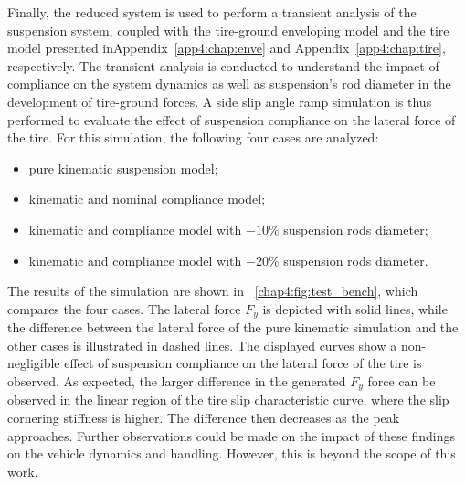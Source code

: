 Finally, the reduced system is used to perform a transient analysis of the suspension system, coupled with the tire-ground enveloping model and the tire model presented inAppendix~\ref{app4:chap:enve} and Appendix~\ref{app4:chap:tire}, respectively. The transient analysis is conducted to understand the impact of compliance on the system dynamics as well as suspension's rod diameter in the development of tire-ground forces. A side slip angle ramp simulation is thus performed to evaluate the effect of suspension compliance on the lateral force of the tire. For this simulation, the following four cases are analyzed:
%
\begin{itemize}
  \setlength\itemsep{0.0em}
  \item pure kinematic suspension model;
  \item kinematic and nominal compliance model;
  \item kinematic and compliance model with $-10\%$ suspension rods diameter;
  \item kinematic and compliance model with $-20\%$ suspension rods diameter.
\end{itemize}
%
The results of the simulation are shown in \figurename~\ref{chap4:fig:test_bench}, which compares the four cases. The lateral force $F_y$ is depicted with solid lines, while the difference between the lateral force of the pure kinematic simulation and the other cases is illustrated in dashed lines. The displayed curves show a non-negligible effect of suspension compliance on the lateral force of the tire is observed. As expected, the larger difference in the generated $F_y$ force can be observed in the linear region of the tire slip characteristic curve, where the slip cornering stiffness is higher. The difference then decreases as the peak approaches. Further observations could be made on the impact of these findings on the vehicle dynamics and handling. However, this is beyond the scope of this work.

